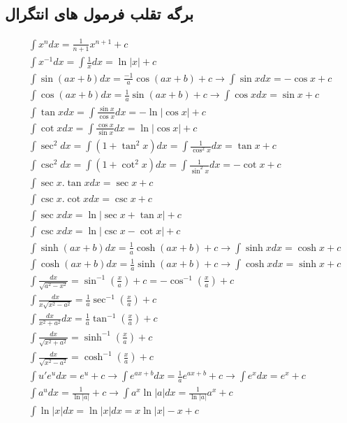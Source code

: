 \newpage
\subsection{برگه تقلب فرمول های انتگرال}
\begin{align*}
&\int x^n dx = \frac{1}{n+1}x^{n+1}+c \\
&\int x^{-1} dx = \int \frac{1}{x} dx = \ln|x|+c \\
&\int \sin (ax+b) dx = \frac{-1}{a} \cos(ax+b)+c \to \int \sin x dx = -\cos x+c \\
&\int \cos (ax+b) dx = \frac{1}{a} \sin(ax+b)+c  \to \int \cos x dx = \sin x+c \\
&\int \tan x dx = \int \frac{\sin x}{\cos x} dx = -\ln|\cos x|+c \\
&\int \cot x dx = \int \frac{\cos x}{\sin x} dx = \ln|\cos x|+c \\
&\int \sec^2 dx = \int (1+\tan^2 x) dx = \int \frac{1}{\cos^2 x} dx = \tan x + c \\
&\int \csc^2 dx = \int (1+\cot^2 x) dx = \int \frac{1}{\sin^2 x} dx = -\cot x + c \\
&\int \sec x.\tan x dx = \sec x + c \\
&\int \csc x.\cot x dx = \csc x + c \\
&\int \sec x dx = \ln|\sec x+\tan x|+c \\
&\int \csc x dx = \ln|\csc x-\cot x|+c \\
&\int \sinh (ax+b) dx = \frac{1}{a} \cosh (ax+b) + c \to \int \sinh x dx = \cosh x + c \\
&\int \cosh (ax+b) dx = \frac{1}{a} \sinh (ax+b) + c \to \int \cosh x dx = \sinh x + c \\
&\int \frac{dx}{\sqrt{a^2-x^2}} = \sin^{-1} (\frac{x}{a}) + c = -\cos^{-1} (\frac{x}{a}) + c \\
&\int \frac{dx}{x\sqrt{x^2-a^2}} = \frac{1}{a} \sec^{-1} (\frac{x}{a}) + c \\
&\int \frac{dx}{x^2+a^2} dx = \frac{1}{a} \tan^{-1} (\frac{x}{a}) + c \\
&\int \frac{dx}{\sqrt{x^2+a^2}} = \sinh^{-1} (\frac{x}{a}) + c \\
&\int \frac{dx}{\sqrt{x^2-a^2}} = \cosh^{-1} (\frac{x}{a}) + c \\
&\int u'e^u dx = e^u + c \to \int e^{ax+b} dx = \frac{1}{a} e^{ax+b} + c \to \int e^x dx = e^x + c \\
&\int a^u dx = \frac{1}{\ln|a|} + c \to \int a^x \ln|a| dx = \frac{1}{\ln|a|} a^x + c  \\
&\int \ln|x| dx = \ln|x| dx = x\ln|x| - x + c \\
\end{align*}
